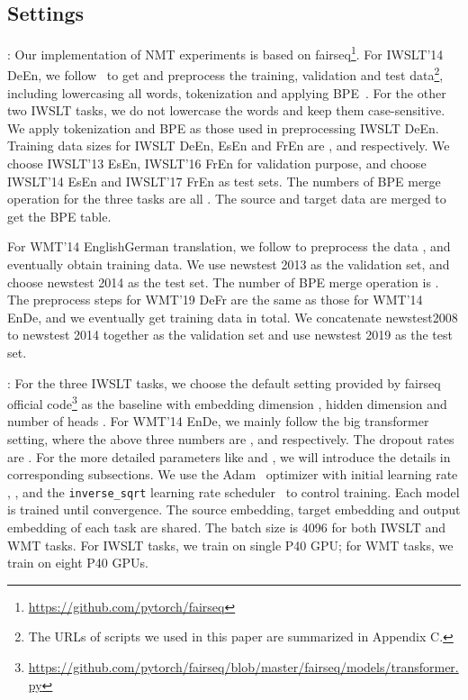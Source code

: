 \documentclass{article}
\begin{document}
\subsection{Settings}
:
Our implementation of NMT experiments is based on fairseq\footnote{\url{https://github.com/pytorch/fairseq}}.
For IWSLT'14 DeEn, we follow~\cite{edunov2018classical} to get and preprocess the training, validation and test data\footnote{The URLs of scripts we used in this paper are summarized in Appendix C.}, including lowercasing all words, tokenization and applying BPE~\cite{sennrich2016bpe}. For the other two IWSLT tasks, we do not lowercase the words and keep them case-sensitive. We apply tokenization and BPE as those used in preprocessing IWSLT DeEn. Training data sizes for IWSLT DeEn, EsEn and FrEn are ,  and  respectively. We choose IWSLT'13 EsEn, IWSLT'16 FrEn for validation purpose, and choose IWSLT'14 EsEn and IWSLT'17 FrEn as test sets. The numbers of BPE merge operation for the three tasks are all . The source and target data are merged to get the BPE table.

For WMT'14 EnglishGerman translation, we follow \cite{ott2018scaling} to preprocess the data , and eventually obtain  training data. We use newstest 2013 as the validation set, and choose newstest 2014 as the test set. The number of BPE merge operation is . The preprocess steps for WMT'19 DeFr are the same as those for WMT'14 EnDe, and we eventually get  training data in total. We concatenate newstest2008 to newstest 2014 together as the validation set and use newstest 2019 as the test set. 


: For the three IWSLT tasks, we choose the default setting provided by fairseq official code\footnote{\url{https://github.com/pytorch/fairseq/blob/master/fairseq/models/transformer.py}} as the baseline with embedding dimension , hidden dimension  and number of heads . For WMT'14 EnDe, we mainly follow the big transformer setting, where the above three numbers are ,  and  respectively. The dropout rates are . For the more detailed parameters like  and , we will introduce the details in corresponding subsections. We use the Adam~\cite{kingma2015adam} optimizer with initial learning rate , ,  and the \texttt{inverse\_sqrt} learning rate scheduler~\cite{vaswani2017attention} to control training. Each model is trained until convergence. The source embedding, target embedding and output embedding of each task are shared. The batch size is 4096 for both IWSLT and WMT tasks. For IWSLT tasks, we train on single P40 GPU; for WMT tasks, we train on eight P40 GPUs.
\end{document}
